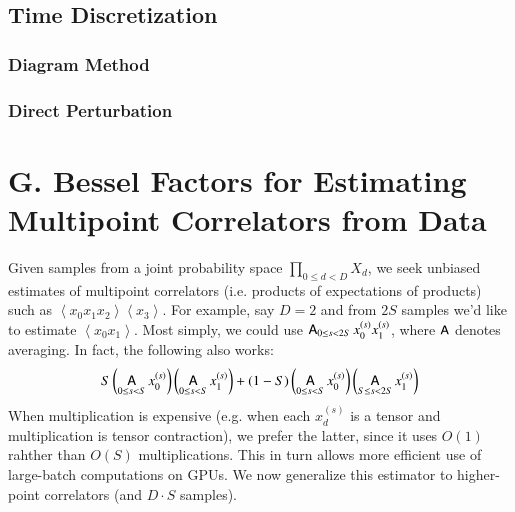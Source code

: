 \documentclass{article}
\newcommand{\wrap}[1]{\left(#1\right)}
\newcommand{\wang}[1]{\left\langle#1\right\rangle}
\DeclareMathOperator*{\Avg}{\text{\sffamily A}}
\begin{document}
    \subsection*{Time Discretization}
        \subsubsection*{Diagram Method}
        \subsubsection*{Direct Perturbation}


\section*{G. Bessel Factors for Estimating Multipoint Correlators from Data}
    Given samples from a joint probability space $\prod_{0\leq d<D} X_d$, we seek
    unbiased estimates of multipoint correlators (i.e. products of expectations
    of products) such as $\wang{x_0 x_1 x_2}\wang{x_3}$.  For example, say $D=2$
    and from $2S$ samples we'd like to estimate $\wang{x_0 x_1}$.  Most simply,
    we could use $\Avg_{0\leq s<2S} x_0^{(s)} x_1^{(s)}$, where $\Avg$ denotes
    averaging.  In fact, the following also works:
    \begin{equation} \label{eq:bessel}
        S
        \wrap{\Avg_{0\leq s< S} x_0^{(s)}}
        \wrap{\Avg_{0\leq s< S} x_1^{(s)}}
        +
        (1-S)
        \wrap{\Avg_{0\leq s< S} x_0^{(s)}}
        \wrap{\Avg_{S\leq s<2S} x_1^{(s)}}
    \end{equation}
    When multiplication is expensive (e.g. when each $x_d^{(s)}$ is a tensor and
    multiplication is tensor contraction), we prefer the latter, since it uses
    $O(1)$ rahther than $O(S)$ multiplications.  This in turn allows more efficient 
    use of large-batch computations on GPUs.  We now generalize this estimator
    to higher-point correlators (and $D\cdot S$ samples).
\end{document}
